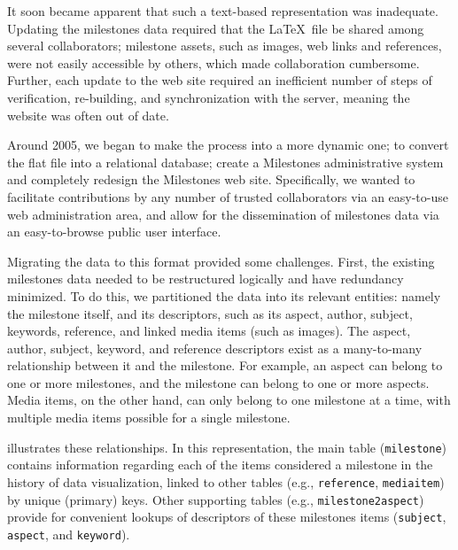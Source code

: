 It soon became apparent that such a text-based representation was inadequate. 
Updating the milestones data required that the \LaTeX\ file be shared among 
several collaborators; milestone assets, such as images, web links and 
references, were not easily accessible by others, which made collaboration 
cumbersome. 
Further, each update to the web site required an inefficient number 
of steps of verification, re-building, and synchronization with the server, 
meaning the website was often out of date.

Around 2005, we began to make the process into a more dynamic one; to convert 
the flat file into a relational database; create a Milestones administrative 
system and completely redesign the Milestones web site. 
Specifically, we wanted 
to facilitate contributions by any number of trusted collaborators via an 
easy-to-use web administration area, and allow for the dissemination of 
milestones data via an easy-to-browse public user interface.

Migrating the data to this format provided some challenges. 
First, the existing 
milestones data needed to be restructured logically
 and have redundancy minimized. 
To do this, we partitioned the data into its relevant entities: namely the 
milestone itself, and its descriptors, such as its aspect, author, subject, 
keywords, reference, and linked media items (such as images). 
The aspect, 
author, subject, keyword, and reference descriptors exist as a many-to-many 
relationship between it and the milestone. 
For example, an aspect can belong to 
one or more milestones, and the milestone can belong to one or more aspects. 
Media items, on the other hand, can only belong to one milestone at a time, 
with multiple media items possible for a single milestone. 

 illustrates these relationships.  In this representation, the main table (\texttt{milestone}) contains information regarding each of the items considered a milestone in the history of data visualization, linked to other tables (e.g., \texttt{reference}, \texttt{mediaitem}) by unique (primary) keys.  Other supporting tables (e.g., \texttt{milestone2aspect}) provide for convenient lookups of descriptors of these milestones items (\texttt{subject}, \texttt{aspect}, and \texttt{keyword}).

